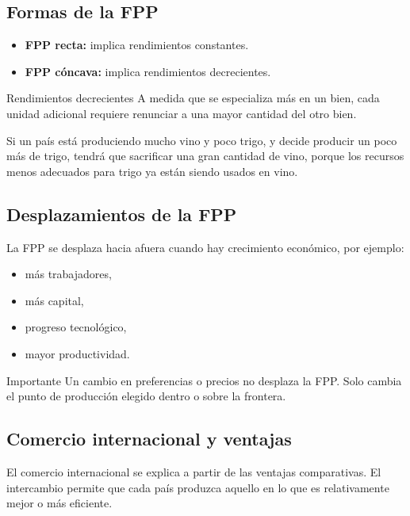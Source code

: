 \subsection{Formas de la FPP}

\begin{itemize}
    \item \textbf{FPP recta:} implica rendimientos constantes.
    \item \textbf{FPP cóncava:} implica rendimientos decrecientes.
\end{itemize}

\begin{concepto}{Rendimientos decrecientes}
A medida que se especializa más en un bien, cada unidad adicional requiere renunciar a una mayor cantidad del otro bien.
\end{concepto}

\begin{ejemplo}
Si un país está produciendo mucho vino y poco trigo, y decide producir un poco más de trigo, tendrá que sacrificar una gran cantidad de vino, porque los recursos menos adecuados para trigo ya están siendo usados en vino.
\end{ejemplo}

\subsection{Desplazamientos de la FPP}

La FPP se desplaza hacia afuera cuando hay crecimiento económico, por ejemplo:
\begin{itemize}
    \item más trabajadores,
    \item más capital,
    \item progreso tecnológico,
    \item mayor productividad.
\end{itemize}

\begin{observacion}{Importante}
Un cambio en preferencias o precios no desplaza la FPP. Solo cambia el punto de producción elegido dentro o sobre la frontera.
\end{observacion}

\subsection{Comercio internacional y ventajas}

El comercio internacional se explica a partir de las ventajas comparativas. El intercambio permite que cada país produzca aquello en lo que es relativamente mejor o más eficiente.

